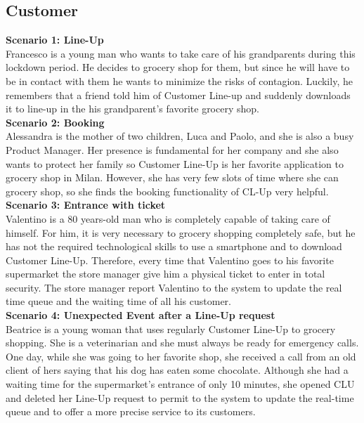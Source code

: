 \subsection{Customer}

\textbf{Scenario 1: Line-Up}\\
Francesco is a young man who wants to take care of his grandparents during this lockdown period. He decides to grocery shop for them, but since he will have to be in contact with them he wants to minimize the risks of contagion. Luckily, he remembers that a friend told him of Customer Line-up and suddenly downloads it to line-up in the his grandparent’s favorite grocery shop.\\
\textbf{Scenario 2: Booking}\\
Alessandra is the mother of two children, Luca and Paolo, and she is also a busy Product Manager. Her presence is fundamental for her company and she also wants to protect her family so Customer Line-Up is her favorite application to grocery shop in Milan. However, she has very few slots of time where she can grocery shop, so she finds the booking functionality of CL-Up very helpful.\\
\textbf{Scenario 3: Entrance with ticket}\\
Valentino is a 80 years-old man who is completely capable of taking care of himself. For him, it is very necessary to grocery shopping completely safe, but he has not the required technological skills to use a smartphone and to download Customer Line-Up. Therefore, every time that Valentino goes to his favorite supermarket the store manager give him a physical ticket to enter in total security. The store manager report Valentino to the system to update the real time queue and the waiting time of all his customer.\\
\textbf{Scenario 4: Unexpected Event after a Line-Up request}\\
Beatrice is a young woman that uses regularly Customer Line-Up to grocery shopping. She is a veterinarian and she must always be ready for emergency calls. One day, while she was going to her favorite shop, she received a call from an old client of hers saying that his dog has eaten some chocolate. Although she had a waiting time for the supermarket’s entrance of only 10 minutes, she opened CLU and deleted her Line-Up request to permit to the system to update the real-time queue and to offer a more precise service to its customers. 


